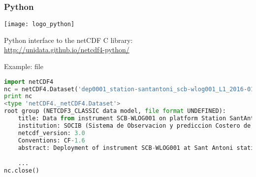 \begin{frame}[c, fragile]
\frametitle{Python}

\texttt{[image: logo\_python]}

Python interface to the netCDF C library:\\
\url{http://unidata.github.io/netcdf4-python/}

Example: file 
\vfill

\begin{lstlisting}[language=python,basicstyle=\tiny,title=Example with ipython]
import netCDF4
nc = netCDF4.Dataset('dep0001_station-santantoni_scb-wlog001_L1_2016-01.nc')
print nc
<type 'netCDF4._netCDF4.Dataset'>
root group (NETCDF3_CLASSIC data model, file format UNDEFINED):
    title: Data from instrument SCB-WLOG001 on platform Station SantAntoni
    institution: SOCIB (Sistema de Observacion y prediccion Costero de las Islas Baleares)
    netcdf_version: 3.0
    Conventions: CF-1.6
    abstract: Deployment of instrument SCB-WLOG001 at Sant Antoni station in endurance line

    ...
nc.close()
\end{lstlisting}

\end{frame}



